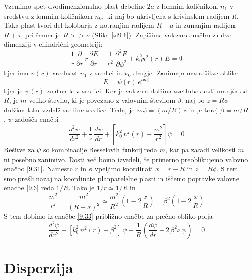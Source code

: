 \documentclass[11pt,fleqn]{book} %
\begin{document}
Vzemimo spet dvodimenzionalno plast debeline $2a$ z lomnim količnikom
$n_{1}$ v sredstvu z lomnim količnikom $n_{0},$ ki naj bo ukrivljena
s krivinskim radijem $R$. Taka plast tvori del kolobarja z notranjim
radijem $R-a$ in zunanjim radijem $R+a$, pri čemer je $\dot{R}>>a$
(Slika \ref{sl9.6}). Zapišimo valovno enačbo za dve dimenziji v cilindrični
geometriji: 
\begin{equation}
\frac{1}{r}\,\frac{\partial}{\partial r}\, r\,\frac{\partial E}{\partial r}+\frac{1}{r^{2}}\,\frac{\partial^{2}E}{\partial\phi^{2}}+k_{0}^{2}n^{2}\left(r\right)\, E=0\label{9.31}
\end{equation}
 kjer ima $n\left(r\right)$ vrednost $n_{1}$ v sredici in $n_{0}$
drugje. Zanimajo nas rešitve oblike 
\begin{equation}
E=\psi\left(r\right)\, e^{im\phi}\label{9.32}
\end{equation}
 kjer je $\psi\left(r\right)$ znatna le v sredici. Ker je valovna
dolžina svetlobe dosti manjša od $R$, je $m$ veliko število, ki
je povezano z valovnim številom $\beta$: naj bo $z=R\phi$ dolžina
loka vzdolž sredine sredice. Tedaj je $m\phi=(m/R)\, z$ in je torej
$\beta=m/R$. $\psi$ zadošča enačbi 
\begin{equation}
\frac{d^{2}\psi}{dr^{2}}+\frac{1}{r}\,\frac{d\psi}{dr}+\left[k_{0}^{2}\, n^{2}\left(r\right)-\frac{m^{2}}{r^{2}}\right]\psi=0\label{9.33}
\end{equation}
 Rešitve za $\psi$ so kombinacije Besselovih funkcij reda $m$, kar
pa zaradi velikosti $m$ ni posebno zanimivo. Dosti več bomo izvedeli,
če primerno preoblikujemo valovno enačbo \ref{9.31}. Namesto $r$
in $\phi$ vpeljimo koordinati $x=r-R$ in $z=R\phi$. S tem smo prešli
nazaj na koordinate planparelelne plasti in iščemo popravke valovne
enacbe \ref{9.3} reda $1/R.$ Tako je $1/r\simeq1/R$ in 
\begin{equation}
\frac{m^{2}}{r^{2}}=\frac{m^{2}}{\left(R+x\right)^{2}}\simeq\frac{m^{2}}{R^{2}}\,\left(1-2\,\frac{x}{R}\right)=\beta^{2}\left(1-2\,\frac{x}{R}\right)\label{9.34}
\end{equation}
 S tem dobimo iz enačbe \ref{9.33} približno enačbo za prečno obliko
polja 
\begin{equation}
\frac{d^{2}\psi}{dx^{2}}+\left[k_{0}^{2}\, n^{2}\left(r\right)-\beta^{2}\right]\,\psi+\frac{1}{R}\,\left(\frac{d\psi}{dr}-2\,\beta^{2}x\,\psi\right)=0\label{9.35}
\end{equation}



\section{Disperzija}
\end{document}
